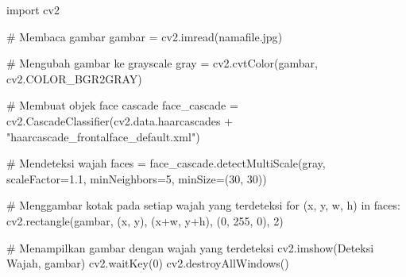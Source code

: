 \documentclass[
  letterpaper,
  DIV=11,
  numbers=noendperiod]{scrreprt}
\newenvironment{Shaded}{\begin{snugshade}}{\end{snugshade}}
\newcommand{\CommentTok}[1]{\textcolor[rgb]{0.37,0.37,0.37}{#1}}
\newcommand{\ControlFlowTok}[1]{\textcolor[rgb]{0.00,0.23,0.31}{#1}}
\newcommand{\DecValTok}[1]{\textcolor[rgb]{0.68,0.00,0.00}{#1}}
\newcommand{\FloatTok}[1]{\textcolor[rgb]{0.68,0.00,0.00}{#1}}
\newcommand{\ImportTok}[1]{\textcolor[rgb]{0.00,0.46,0.62}{#1}}
\newcommand{\KeywordTok}[1]{\textcolor[rgb]{0.00,0.23,0.31}{#1}}
\newcommand{\NormalTok}[1]{\textcolor[rgb]{0.00,0.23,0.31}{#1}}
\newcommand{\OperatorTok}[1]{\textcolor[rgb]{0.37,0.37,0.37}{#1}}
\newcommand{\StringTok}[1]{\textcolor[rgb]{0.13,0.47,0.30}{#1}}
\begin{document}
\begin{Shaded}
\begin{Highlighting}[]
\ImportTok{import}\NormalTok{ cv2}

\CommentTok{\# Membaca gambar}
\NormalTok{gambar }\OperatorTok{=}\NormalTok{ cv2.imread(}\StringTok{\textquotesingle{}namafile.jpg\textquotesingle{}}\NormalTok{)}

\CommentTok{\# Mengubah gambar ke grayscale}
\NormalTok{gray }\OperatorTok{=}\NormalTok{ cv2.cvtColor(gambar, cv2.COLOR\_BGR2GRAY)}

\CommentTok{\# Membuat objek face cascade}
\NormalTok{face\_cascade }\OperatorTok{=}\NormalTok{ cv2.CascadeClassifier(cv2.data.haarcascades }\OperatorTok{+} \StringTok{"haarcascade\_frontalface\_default.xml"}\NormalTok{)}

\CommentTok{\# Mendeteksi wajah}
\NormalTok{faces }\OperatorTok{=}\NormalTok{ face\_cascade.detectMultiScale(gray, scaleFactor}\OperatorTok{=}\FloatTok{1.1}\NormalTok{, minNeighbors}\OperatorTok{=}\DecValTok{5}\NormalTok{, minSize}\OperatorTok{=}\NormalTok{(}\DecValTok{30}\NormalTok{, }\DecValTok{30}\NormalTok{))}

\CommentTok{\# Menggambar kotak pada setiap wajah yang terdeteksi}
\ControlFlowTok{for}\NormalTok{ (x, y, w, h) }\KeywordTok{in}\NormalTok{ faces:}
\NormalTok{    cv2.rectangle(gambar, (x, y), (x}\OperatorTok{+}\NormalTok{w, y}\OperatorTok{+}\NormalTok{h), (}\DecValTok{0}\NormalTok{, }\DecValTok{255}\NormalTok{, }\DecValTok{0}\NormalTok{), }\DecValTok{2}\NormalTok{)}

\CommentTok{\# Menampilkan gambar dengan wajah yang terdeteksi}
\NormalTok{cv2.imshow(}\StringTok{\textquotesingle{}Deteksi Wajah\textquotesingle{}}\NormalTok{, gambar)}
\NormalTok{cv2.waitKey(}\DecValTok{0}\NormalTok{)}
\NormalTok{cv2.destroyAllWindows()}
\end{Highlighting}
\end{Shaded}
\end{document}
